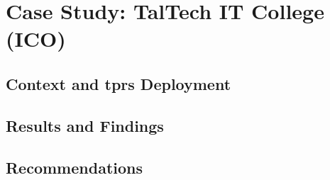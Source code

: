 
\newpage
\section{Case Study: TalTech IT College (ICO)}

\subsection{Context and \ac{tprs} Deployment}


\subsection{Results and Findings}


\subsection{Recommendations}

